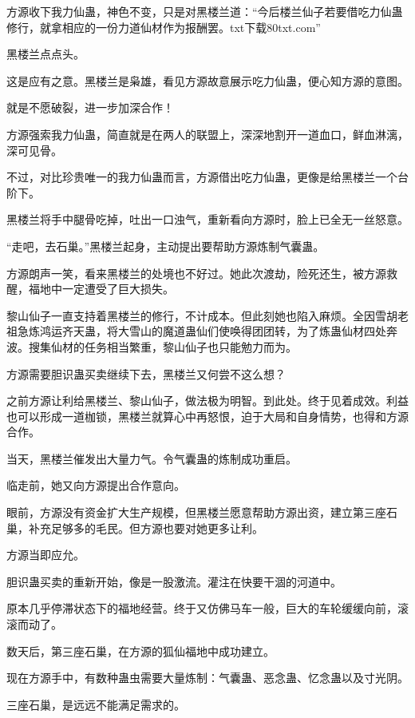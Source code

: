 
\begin{this_body}

方源收下我力仙蛊，神色不变，只是对黑楼兰道：“今后楼兰仙子若要借吃力仙蛊修行，就拿相应的一份力道仙材作为报酬罢。txt下载80txt.com”

黑楼兰点点头。

这是应有之意。黑楼兰是枭雄，看见方源故意展示吃力仙蛊，便心知方源的意图。

就是不愿破裂，进一步加深合作！

方源强索我力仙蛊，简直就是在两人的联盟上，深深地割开一道血口，鲜血淋漓，深可见骨。

不过，对比珍贵唯一的我力仙蛊而言，方源借出吃力仙蛊，更像是给黑楼兰一个台阶下。

黑楼兰将手中腿骨吃掉，吐出一口浊气，重新看向方源时，脸上已全无一丝怒意。

“走吧，去石巢。”黑楼兰起身，主动提出要帮助方源炼制气囊蛊。

方源朗声一笑，看来黑楼兰的处境也不好过。她此次渡劫，险死还生，被方源救醒，福地中一定遭受了巨大损失。

黎山仙子一直支持着黑楼兰的修行，不计成本。但此刻她也陷入麻烦。全因雪胡老祖急炼鸿运齐天蛊，将大雪山的魔道蛊仙们使唤得团团转，为了炼蛊仙材四处奔波。搜集仙材的任务相当繁重，黎山仙子也只能勉力而为。

方源需要胆识蛊买卖继续下去，黑楼兰又何尝不这么想？

之前方源让利给黑楼兰、黎山仙子，做法极为明智。到此处。终于见着成效。利益也可以形成一道枷锁，黑楼兰就算心中再怒恨，迫于大局和自身情势，也得和方源合作。

当天，黑楼兰催发出大量力气。令气囊蛊的炼制成功重启。

临走前，她又向方源提出合作意向。

眼前，方源没有资金扩大生产规模，但黑楼兰愿意帮助方源出资，建立第三座石巢，补充足够多的毛民。但方源也要对她更多让利。

方源当即应允。

胆识蛊买卖的重新开始，像是一股激流。灌注在快要干涸的河道中。

原本几乎停滞状态下的福地经营。终于又仿佛马车一般，巨大的车轮缓缓向前，滚滚而动了。

数天后，第三座石巢，在方源的狐仙福地中成功建立。

现在方源手中，有数种蛊虫需要大量炼制：气囊蛊、恶念蛊、忆念蛊以及寸光阴。

三座石巢，是远远不能满足需求的。


\end{this_body}
